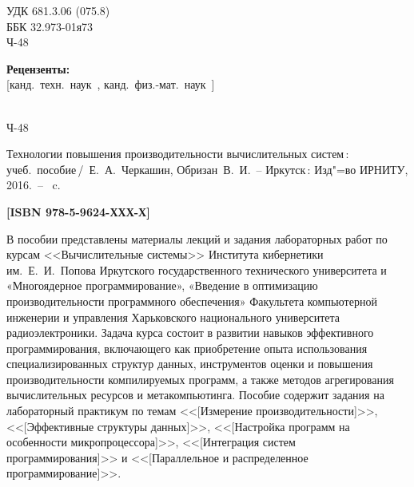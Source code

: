 \documentclass[14pt, a4paper, openany, twoside, final]{extbook} %
\newcommand{\e}[2][fcolor]{\textcolor{pcolor}{[}\textcolor{#1}{#2}\textcolor{pcolor}{]}}
\begin{document}
\newpage
\begin{mygroup}
\thispagestyle{empty}
\noindent УДК 681.3.06 (075.8)\\ %
\noindent ББК 32.973-01я73\\ %
\noindent\mbox{}\hspace{2em}Ч-48 %
\vfill
\begin{center}\small
\textbf{Рецензенты:} \\
\e{канд.~техн.~наук~{\em }, канд.~физ.-мат.~наук~{\em }}
\end{center}
\vfill
\noindent\begin{minipage}[t]{2em}
\noindent\mbox{}\\
Ч-48
\end{minipage}%
\begin{minipage}[t]{0.95\linewidth}
\setlength{\parindent}{5ex}

Технологии повышения производительности вычислительных систем\,{}: учеб.~пособие\,/~Е.~А.~Черкашин, Обризан~В.~И.~-- Иркутск\,: Изд"=во ИРНИТУ, 2016.~-- \pageref{lastpage}~c.

{\bfseries \e{ISBN 978-5-9624-ХХХ-Х}}
\vspace{2ex}

\begingroup\small\parskip0pt
\vspace{1ex} В пособии представлены материалы лекций и задания лабораторных работ по курсам <<Вычислительные системы>> Института кибернетики им.~Е.~И.~Попова Иркутского государственного технического университета и «Многоядерное программирование», «Введение в оптимизацию производительности программного обеспечения» Факультета компьютерной инженерии и управления Харьковского национального университета радиоэлектроники.  Задача курса состоит в развитии навыков эффективного программирования, включающего как приобретение опыта использования специализированных структур данных, инструментов оценки и повышения производительности компилируемых программ, а также методов агрегирования вычислительных ресурсов и метакомпьютинга.  Пособие содержит задания на лабораторный практикум по темам <<\e{Измерение производительности}>>, <<\e{Эффективные структуры данных}>>, <<\e{Настройка программ на особенности микропроцессора}>>, <<\e{Интеграция систем программирования}>> и <<\e{Параллельное и распределенное программирование}>>.


\end{minipage}
\end{mygroup}
\end{document}
